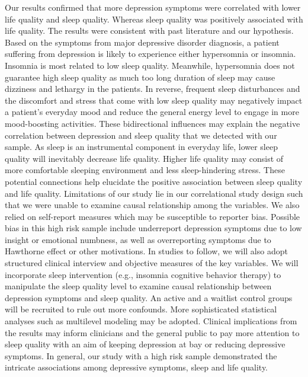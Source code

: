 \documentclass[man]{apa6}
\theoremstyle{definition}
\theoremstyle{definition}
\theoremstyle{definition}
\theoremstyle{remark}
\begin{document}
Our results confirmed that more depression symptoms were correlated with
lower life quality and sleep quality. Whereas sleep quality was
positively associated with life quality. The results were consistent
with past literature and our hypothesis. Based on the symptoms from
major depressive disorder diagnosis, a patient suffering from depression
is likely to experience either hypersomnia or insomnia. Insomnia is most
related to low sleep quality. Meanwhile, hypersomnia does not guarantee
high sleep quality as much too long duration of sleep may cause
dizziness and lethargy in the patients. In reverse, frequent sleep
disturbances and the discomfort and stress that come with low sleep
quality may negatively impact a patient's everyday mood and reduce the
general energy level to engage in more mood-boosting activities. These
bidirectional influences may explain the negative correlation between
depression and sleep quality that we detected with our sample. As sleep
is an instrumental component in everyday life, lower sleep quality will
inevitably decrease life quality. Higher life quality may consist of
more comfortable sleeping environment and less sleep-hindering stress.
These potential connections help elucidate the positive association
between sleep quality and life quality. Limitations of our study lie in
our correlational study design such that we were unable to examine
causal relationship among the variables. We also relied on self-report
measures which may be susceptible to reporter bias. Possible bias in
this high risk sample include underreport depression symptoms due to low
insight or emotional numbness, as well as overreporting symptoms due to
Hawthorne effect or other motivations. In studies to follow, we will
also adopt structured clinical interview and objective measures of the
key variables. We will incorporate sleep intervention (e.g., insomnia
cognitive behavior therapy) to manipulate the sleep quality level to
examine causal relationship between depression symptoms and sleep
quality. An active and a waitlist control groups will be recruited to
rule out more confounds. More sophisticated statistical analyses such as
multilevel modeling may be adopted. Clinical implications from the
results may inform clinicians and the general public to pay more
attention to sleep quality with an aim of keeping depression at bay or
reducing depressive symptoms. In general, our study with a high risk
sample demonstrated the intricate associations among depressive
symptoms, sleep and life quality.

\newpage
\end{document}
